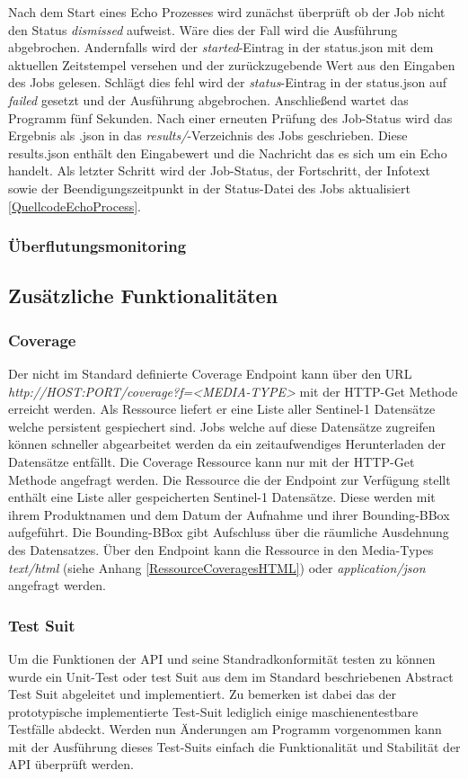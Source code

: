 Nach dem Start eines Echo Prozesses wird zunächst überprüft ob der Job nicht den Status \textit{dismissed} aufweist. Wäre dies der Fall wird die Ausführung abgebrochen. 
Andernfalls wird der \textit{started}-Eintrag in der status.json mit dem aktuellen Zeitstempel versehen und der zurückzugebende Wert aus den Eingaben des Jobs gelesen.
Schlägt dies fehl wird der \textit{status}-Eintrag in der status.json auf \textit{failed} gesetzt und der Ausführung abgebrochen. 
Anschließend wartet das Programm fünf Sekunden. Nach einer erneuten Prüfung des Job-Status wird das Ergebnis als .json in das \textit{results/}-Verzeichnis des Jobs geschrieben.
Diese results.json enthält den Eingabewert und die Nachricht das es sich um ein Echo handelt. 
Als letzter Schritt wird der Job-Status, der Fortschritt, der Infotext sowie der Beendigungszeitpunkt in der Status-Datei des Jobs aktualisiert \ref{QuellcodeEchoProcess}. 
\subsubsection{Überflutungsmonitoring}
\subsection{Zusätzliche Funktionalitäten}
\subsubsection{Coverage} 
Der nicht im Standard definierte Coverage Endpoint kann über den URL \textit{http://HOST:PORT/coverage?f=<MEDIA-TYPE>} mit der HTTP-Get Methode erreicht werden. 
Als Ressource liefert er eine Liste aller Sentinel-1 Datensätze welche persistent gespiechert sind. 
Jobs welche auf diese Datensätze zugreifen können schneller abgearbeitet werden da ein zeitaufwendiges Herunterladen der Datensätze entfällt. 
Die Coverage Ressource kann nur mit der HTTP-Get Methode angefragt werden. 
Die Ressource die der Endpoint zur Verfügung stellt enthält eine Liste aller gespeicherten Sentinel-1 Datensätze. 
Diese werden mit ihrem Produktnamen und dem Datum der Aufnahme 
und ihrer Bounding-BBox aufgeführt. Die Bounding-BBox gibt Aufschluss über die räumliche Ausdehnung des Datensatzes. 
Über den Endpoint kann die Ressource in den Media-Types \textit{text/html} (siehe Anhang \ref{RessourceCoveragesHTML}) oder \textit{application/json} angefragt werden. 

\subsubsection{Test Suit}
Um die Funktionen der API und seine Standradkonformität testen zu können wurde ein Unit-Test oder test Suit aus dem im Standard beschriebenen Abstract Test Suit abgeleitet und 
implementiert. Zu bemerken ist dabei das der prototypische implementierte Test-Suit lediglich einige maschienentestbare Testfälle abdeckt. 
Werden nun Änderungen am Programm vorgenommen kann mit der Ausführung dieses Test-Suits einfach die Funktionalität und Stabilität der API überprüft werden. 